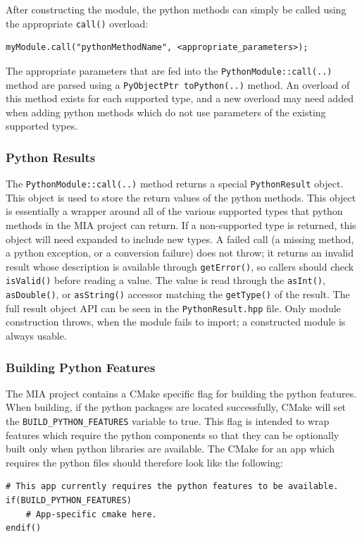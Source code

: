 After constructing the module, the python methods can simply be called using the appropriate \texttt{call()} overload:
\begin{lstlisting}[style=cppstyle]
myModule.call("pythonMethodName", <appropriate_parameters>);
\end{lstlisting}
The appropriate parameters that are fed into the \texttt{PythonModule::call(..)} method are parsed using a \texttt{PyObjectPtr toPython(..)} method. An overload of this method exists for each supported type, and a new overload may need added when adding python methods which do not use parameters of the existing supported types.


\subsubsection{Python Results}

The \texttt{PythonModule::call(..)} method returns a special \texttt{PythonResult} object. This object is used to store the return values of the python methods. This object is essentially a wrapper around all of the various supported types that python methods in the MIA project can return. If a non-supported type is returned, this object will need expanded to include new types. A failed call (a missing method, a python exception, or a conversion failure) does not throw; it returns an invalid result whose description is available through \texttt{getError()}, so callers should check \texttt{isValid()} before reading a value. The value is read through the \texttt{asInt()}, \texttt{asDouble()}, or \texttt{asString()} accessor matching the \texttt{getType()} of the result. The full result object API can be seen in the \texttt{PythonResult.hpp} file. Only module construction throws, when the module fails to import; a constructed module is always usable.



\subsubsection{Building Python Features}

The MIA project contains a CMake specific flag for building the python features. When building, if the python packages are located successfully, CMake will set the \texttt{BUILD\_PYTHON\_FEATURES} variable to true. This flag is intended to wrap features which require the python components so that they can be optionally built only when python libraries are available. The CMake for an app which requires the python files should therefore look like the following:
\begin{lstlisting}[style=makestyle]
# This app currently requires the python features to be available.
if(BUILD_PYTHON_FEATURES)
	# App-specific cmake here.
endif()
\end{lstlisting}


